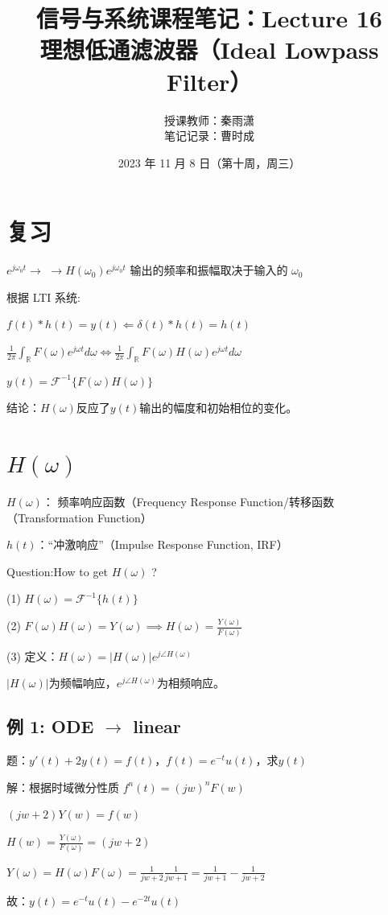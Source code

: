 \documentclass[UTF8]{ctexart}
\begin{document}
\title{信号与系统课程笔记：Lecture 16 \\
理想低通滤波器（Ideal Lowpass Filter）}
\author{授课教师：秦雨潇 \\
        笔记记录：曹时成}
\date{2023 年 11 月 8 日（第十周，周三）}
\maketitle

\section{复习}
$e^{j\omega_0 t}\longrightarrow $  $\longrightarrow H(\omega_0 )e^{j\omega_0t}$ \qquad 输出的频率和振幅取决于输入的 $\omega_0$ \par
根据 LTI 系统: \par
$f(t)\ast h(t)=y(t)\Leftarrow \delta (t)\ast h(t)=h(t)$ \par
$\frac{1}{2\pi}\int_{\mathbb{R}} F(\omega)e^{j\omega t} d\omega\Longleftrightarrow \frac{1}{2\pi}\int_{\mathbb{R}} F(\omega)H(\omega)e^{j\omega t} d\omega$\par
$y(t)=\mathscr{F}^{-1}\{F(\omega)H(\omega)\}$ \par
结论：$H(\omega)$反应了$y(t)$输出的幅度和初始相位的变化。 \par
\section{$H(\omega)$}
$H(\omega)$： 频率响应函数（Frequency Response Function/转移函数（Transformation Function） \par
$ h(t)$：“冲激响应”（Impulse Response Function, IRF）\par
Question:How to get $H(\omega)$ ?\par
(1) $H(\omega)=\mathscr{F}^{-1}\{h(t)\}$\par
(2) $F(\omega)H(\omega)=Y(\omega)\implies H(\omega)=\frac{Y(\omega)}{F(\omega)}  $\par
(3) 定义：$H(\omega)=| H(\omega)\vert e^{j\angle H(\omega)}$   \par
$| H(\omega)\vert$为频幅响应，$e^{j\angle H(\omega)}$为相频响应。\par
\subsection{例 1: ODE $\rightarrow $ linear}
题：$y'(t)+2y(t)=f(t)$，$f(t)=e^{-t}u(t)$，求$y(t)$ \par
解：根据时域微分性质 $f^n(t)=(jw)^nF(w)$ \par
\qquad $(jw+2)Y(w)=f(w)$ \par
\qquad $H(w)=\frac{Y(\omega)}{F(\omega)}=(jw+2)$ \par
\qquad $Y(\omega)=H(\omega)F(\omega)=\frac{1}{jw+2} \frac{1}{jw+1}=\frac{1}{jw+1}-\frac{1}{jw+2}$ \par
\qquad 故：$y(t)=e^{-t}u(t)-e^{-2t}u(t)$ \par
\end{document}
